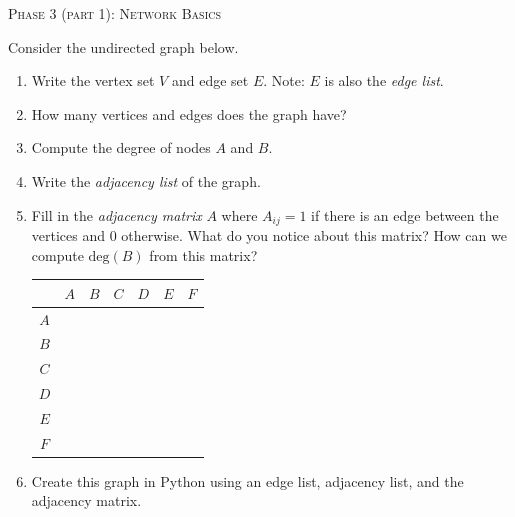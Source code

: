 \documentclass[10pt]{article}
\begin{document}
\begin{center}
\Large{\textsc{Phase 3 (part 1): Network Basics}}\\
\end{center}

\begin{enumerate}[{$1.]$}]
\item Consider the undirected graph below.

\begin{center}
\end{center}

\begin{enumerate}[{$a.)$}]
\item Write the vertex set $V$ and edge set $E$.  Note: $E$ is also the \textit{edge list}.
\vfill
\item How many vertices and edges does the graph have?
\vfill
\item Compute the degree of nodes $A$ and $B$. 
\vfill
\item Write the \textit{adjacency list} of the graph.
\vfill
\item Fill in the \textit{adjacency matrix} $A$ where $A_{ij}=1$ if there is an edge between the vertices and $0$ otherwise. What do you notice about this matrix?  How can we compute $\text{deg}(B)$ from this matrix? 

\renewcommand{\arraystretch}{1.4}
\begin{tabular}{c|cccccc}
 & $A$ & $B$ & $C$ & $D$ & $E$ & $F$\\ \hline
$A$ &  &  &  &  &  &  \\
$B$ &  &  &  &  &  &  \\
$C$ &  &  &  &  &  &  \\
$D$ &  &  &  &  &  &  \\
$E$ &  &  &  &  &  &  \\
$F$ &  &  &  &  &  &  \\
\end{tabular}

\item Create this graph in Python using an edge list, adjacency list, and the adjacency matrix. 



\end{enumerate}
\end{enumerate}
\end{document}
